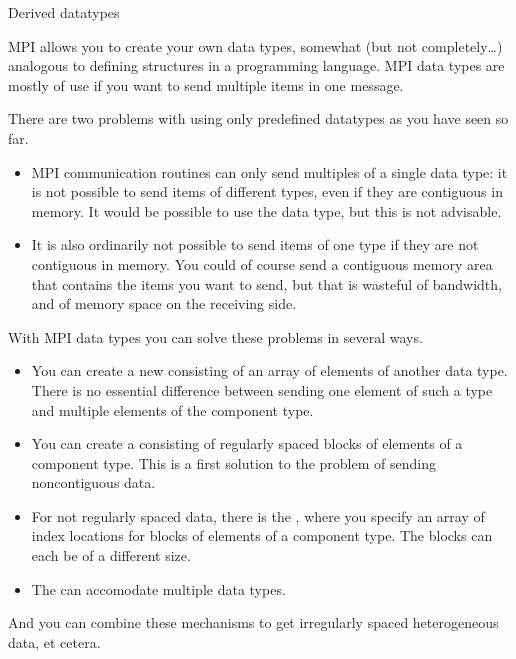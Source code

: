 
 {Derived datatypes}
\label{sec:derived-types}

MPI allows you to create your own data types, somewhat (but not completely\ldots)
analogous to defining
structures in a programming language. MPI data types are mostly of use
if you want to send multiple items in one message.

There are two problems with using only predefined datatypes
as you have seen so far.
\begin{itemize}
\item MPI communication routines can only send multiples of a
  single data type: it is not possible to send items of different
  types, even if they are contiguous in memory. It would be possible
  to use the  data type, but this is not advisable.
\item It is also ordinarily not possible to send items of one type if they are
  not contiguous in memory. You could of course send a contiguous memory area
  that contains the items you want to send, but that is wasteful of
  bandwidth, and of memory space on the receiving side.
\end{itemize}
With MPI data types you can solve these problems in several ways.
\begin{itemize}
\item You can create a new 
  consisting of an array of elements of another data type. There is no
  essential difference between sending one element of such a type
  and multiple elements of the
  component type.
\item You can create a  consisting of
  regularly spaced blocks of elements of a component type. This is a first
  solution to the problem of sending noncontiguous data.
\item For not regularly spaced data, there is the
  , where you specify an array of
  index locations for blocks of elements of a component type.
  The blocks can each be of a different size.
\item The  can accomodate multiple
  data types.
\end{itemize}
And you can combine these mechanisms to get irregularly spaced
heterogeneous data, et cetera.

